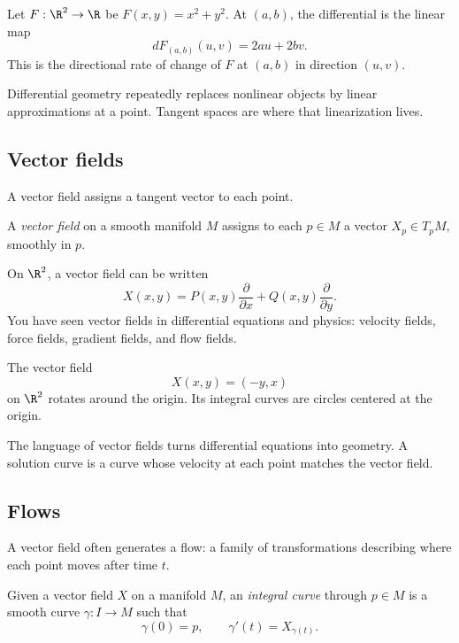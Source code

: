 \begin{example}
Let $F:\R^2\to\R$ be $F(x,y)=x^2+y^2$. At $(a,b)$, the differential is the
linear map
\[
dF_{(a,b)}(u,v)=2au+2bv.
\]
This is the directional rate of change of $F$ at $(a,b)$ in direction $(u,v)$.
\end{example}

\begin{focusbox}
Differential geometry repeatedly replaces nonlinear objects by linear
approximations at a point. Tangent spaces are where that linearization lives.
\end{focusbox}

\subsection{Vector fields}

A vector field assigns a tangent vector to each point.

\begin{definition}
A \emph{vector field} on a smooth manifold $M$ assigns to each $p\in M$ a
vector $X_p\in T_pM$, smoothly in $p$.
\end{definition}

On $\R^2$, a vector field can be written
\[
X(x,y)=P(x,y)\frac{\partial}{\partial x}+Q(x,y)\frac{\partial}{\partial y}.
\]
You have seen vector fields in differential equations and physics: velocity
fields, force fields, gradient fields, and flow fields.

\begin{example}
The vector field
\[
X(x,y)=(-y,x)
\]
on $\R^2$ rotates around the origin. Its integral curves are circles centered
at the origin.
\end{example}

The language of vector fields turns differential equations into geometry. A
solution curve is a curve whose velocity at each point matches the vector field.

\subsection{Flows}

A vector field often generates a flow: a family of transformations describing
where each point moves after time $t$.

\begin{definition}
Given a vector field $X$ on a manifold $M$, an \emph{integral curve} through
$p\in M$ is a smooth curve $\gamma:I\to M$ such that
\[
\gamma(0)=p,\qquad \gamma'(t)=X_{\gamma(t)}.
\]
\end{definition}

